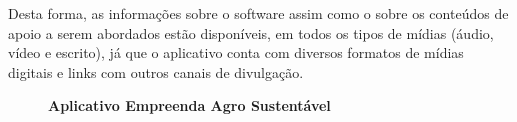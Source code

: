 Desta forma, as informações sobre o software assim como o sobre os conteúdos de apoio a serem abordados estão disponíveis, em todos os tipos de mídias (áudio, vídeo e escrito), já que o aplicativo conta com diversos formatos de mídias digitais e links com outros canais de divulgação.

\begin{figure}[H]
\FloatBarrier
\center
\caption{\textbf{Aplicativo Empreenda Agro Sustentável}}

\end{figure}
